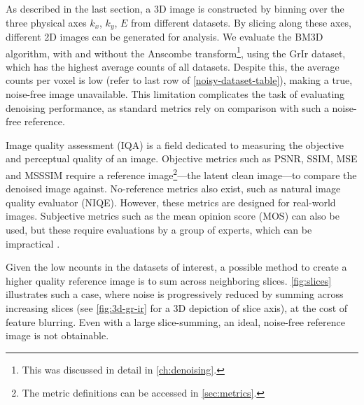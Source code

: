 As described in the last section, a 3D image is constructed by binning over the three physical axes $k_x$, $k_y$, $E$ from different datasets. By slicing along these axes, different 2D images can be generated for analysis. We evaluate the \gls{BM3D} algorithm, with and without the Anscombe transform\footnote{This was discussed in detail in \cref{ch:denoising}.}, using the \gls{GrIr} dataset, which has the highest average counts of all datasets. Despite this, the average counts per voxel is low (refer to last row of \cref{noisy-dataset-table}), making a true, noise-free image unavailable. This limitation complicates the task of evaluating denoising performance, as standard metrics rely on comparison with such a noise-free reference.


Image quality assessment (IQA) is a field dedicated to measuring the objective and perceptual  quality of an image. Objective metrics such as \gls{PSNR}, \gls{SSIM}, \gls{MSE} and \gls{MSSSIM} require a reference image\footnote{The metric definitions can be accessed in \cref{sec:metrics}.}---the latent clean image---to compare the denoised image against. No-reference metrics also exist, such as natural image quality evaluator (NIQE). However, these metrics are designed for real-world images. Subjective metrics such as the mean opinion score (MOS) can also be used, but these require evaluations by a group of experts, which can be impractical \cite{eskiciogluImageQualityMeasures1995,linzhangFSIMFeatureSimilarity2011}.


Given the low \gls{ncounts} in the datasets of interest, a possible method to create a higher quality reference image is to sum across neighboring slices. \cref{fig:slices} illustrates such a case, where noise is progressively reduced by summing across increasing slices (see \cref{fig:3d-gr-ir} for a 3D depiction of slice axis), at the cost of feature blurring. Even with a large slice-summing, an ideal, noise-free reference image is not obtainable.

